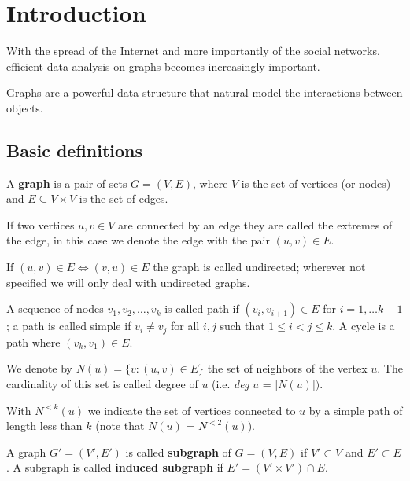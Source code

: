 
\chapter{Introduction}

With the spread of the Internet and more importantly of the social networks, efficient data analysis on graphs becomes increasingly important. 

Graphs are a powerful data structure that natural model the interactions between objects.

\section{Basic definitions}

\begin{definizione}\label{def:graph}
	A \textbf{graph} is a pair of sets $G=(V,E)$, where $V$ is the set of vertices (or nodes) and $E \subseteq V \times V$ is the set of edges.
\end{definizione}

If two vertices $u, v \in V$ are connected by an edge they are called the extremes of the edge, in this case we denote the edge with the pair $(u, v) \in E$.

If $(u,v) \in E \Leftrightarrow (v,u) \in E$ the graph is called undirected; wherever not specified we will only deal with undirected graphs.

A sequence of nodes  $v_{1}, v_{2}, \ldots, v_{k}$ is called path if $(v_{i}, v_{i+1}) \in E$ for $i = 1, \ldots k-1$; a path is called simple if $v_{i} \neq v_{j}$ for all $i,j$ such that $1 \leq i < j \leq k$. A cycle is a path where $(v_{k}, v_{1}) \in E$.

We denote by $N(u) = \{ v : (u,v) \in E \}$ the set of neighbors of the vertex $u$. The cardinality of this set is called degree of $u$ (i.e. \textit{deg} $u$ = $|N(u)|)$. 

With $N^{<k}(u)$ we indicate the set of vertices connected to $u$ by a simple path of length less than $k$ (note that $N(u)$ = $N^{<2}(u)$).

\begin{definizione}\label{def:subgraph}
	A graph $G' = (V', E')$ is called \textbf{subgraph} of $G=(V,E)$ if $V' \subset V$ and $E' \subset E$. A subgraph is called \textbf{induced subgraph} if $E' = (V' \times V') \cap E$.
\end{definizione}

